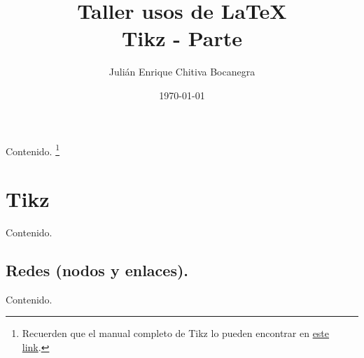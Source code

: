 \documentclass[dvipsnames,xcolor=x11names, handout]{beamer}
\title{Taller usos de \LaTeX \\ \small{Tikz - Parte \Rom{2}} \vspace*{-0.2cm}}
\author[Julián Chitiva Bocanegra]{Julián Enrique Chitiva Bocanegra}
\institute[Uniandes] 
{Universidad de los Andes\\ Facultad de Economía}
\date{\today}
\theoremstyle{plain}
\theoremstyle{definition}
\begin{document}
\begin{frame}
  \titlepage
\end{frame}
\begin{frame}{Contenido.}
  \tableofcontents
  \footnote{Recuerden que el manual completo de Tikz lo pueden encontrar en \href{https://www.bu.edu/math/files/2013/08/tikzpgfmanual.pdf}{\textcolor{colorClase}{este link}}.}
\end{frame}

\section{Tikz}
\begin{frame}{Contenido.}
  \tableofcontents[currentsection]
\end{frame}

\subsection{Redes (nodos y enlaces).}
\begin{frame}{Contenido.}
  \tableofcontents[currentsubsection]
\end{frame}
\end{document}
